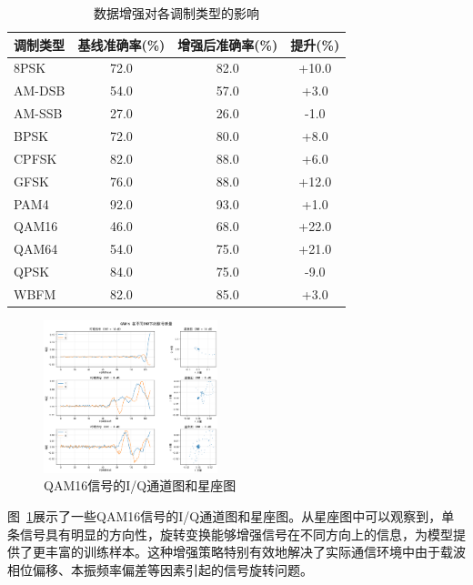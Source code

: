 \documentclass[conference]{IEEEtran}
\begin{document}
\begin{table}[h]
\centering
\caption{数据增强对各调制类型的影响}
\label{tab:data_augmentation_results}
\begin{tabular}{@{}lccc@{}}
\toprule
调制类型 & 基线准确率(\%) & 增强后准确率(\%) & 提升(\%) \\
\midrule
8PSK     & 72.0  & 82.0  & +10.0 \\
AM-DSB   & 54.0  & 57.0  & +3.0  \\
AM-SSB   & 27.0  & 26.0  & -1.0  \\
BPSK     & 72.0  & 80.0  & +8.0  \\
CPFSK    & 82.0  & 88.0  & +6.0  \\
GFSK     & 76.0  & 88.0  & +12.0 \\
PAM4     & 92.0  & 93.0  & +1.0  \\
QAM16    & 46.0  & 68.0  & +22.0 \\
QAM64    & 54.0  & 75.0  & +21.0 \\
QPSK     & 84.0  & 75.0  & -9.0  \\
WBFM     & 82.0  & 85.0  & +3.0  \\
\bottomrule
\end{tabular}
\end{table}

\begin{figure}[htbp]
\centering
\includegraphics[width=0.45\textwidth]{figure/QAM16_rotation.png}
\caption{QAM16信号的I/Q通道图和星座图}
\label{fig:rotation_augmentation}
\end{figure}

图~\ref{fig:rotation_augmentation}展示了一些QAM16信号的I/Q通道图和星座图。从星座图中可以观察到，单条信号具有明显的方向性，旋转变换能够增强信号在不同方向上的信息，为模型提供了更丰富的训练样本。这种增强策略特别有效地解决了实际通信环境中由于载波相位偏移、本振频率偏差等因素引起的信号旋转问题。

\end{document}
